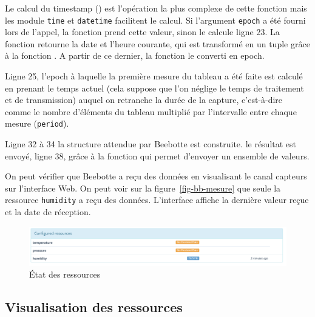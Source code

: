        \vspace{1em}

Le calcul du timestamp () est l’opération la plus complexe de cette fonction mais les module \texttt{time} et \texttt{datetime} facilitent le calcul. 
Si l'argument \texttt{epoch} a été fourni lors de l'appel, la fonction prend cette valeur, sinon le calcule ligne 23. La fonction  retourne la date et l'heure courante, qui est transformé en un tuple grâce à la fonction . A partir de ce dernier, la fonction  le converti en epoch. 



Ligne 25, l'epoch à laquelle la première mesure du tableau a été faite est calculé en prenant le temps actuel (cela suppose que l’on néglige le temps de traitement et de transmission) auquel on retranche la durée de la capture, c’est-à-dire comme le nombre d’éléments du tableau multiplié par l’intervalle entre chaque mesure (\texttt{period}). 

Ligne 32 à 34 la structure attendue par Beebotte est construite. le résultat est envoyé, ligne 38, grâce à la fonction  qui permet d'envoyer un ensemble de valeurs.

       \vspace{1em}

On peut vérifier que Beebotte a reçu des données en visualisant le canal capteurs sur l’interface Web. On peut voir sur la  figure~\vref{fig-bb-mesure} que seule la ressource \texttt{humidity} a reçu des données. L’interface affiche la dernière valeur reçue et la date de réception.

\begin{figure}[tbp]
\centerline{\includegraphics[width=1\columnwidth]{Pictures/bb_mesures.png}}
\caption{État des ressources}
\label{fig-bb-mesure}
\end{figure}

\subsection{Visualisation des ressources}

